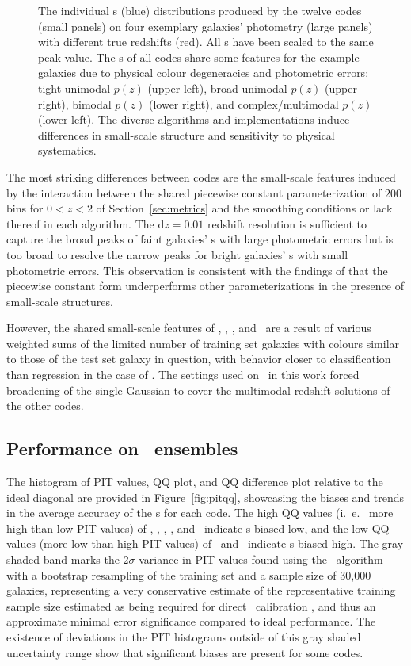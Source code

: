 \begin{figure}
\caption{The individual \pzpdf s (blue) distributions produced by the twelve codes (small panels) on four exemplary galaxies' photometry (large panels) with different true redshifts (red).
All \pzpdf s have been scaled to the same peak value.
The \pzpdf s of all codes share some features for the example galaxies due to physical colour degeneracies and photometric errors: tight unimodal $p(z)$ (upper left), broad unimodal $p(z)$ (upper right), bimodal $p(z)$ (lower right), and complex/multimodal $p(z)$ (lower left).
The diverse algorithms and implementations induce differences in small-scale structure and sensitivity to physical systematics.}
\label{fig:pz_examples}
\end{figure}

The most striking differences between codes are the small-scale features induced by the interaction between the shared piecewise constant parameterization of $200$ bins for $0 < z < 2$ of Section~\ref{sec:metrics} and the smoothing conditions or lack thereof in each algorithm.
The $\mathrm{d}z = 0.01$ redshift resolution is sufficient to capture the broad peaks of faint galaxies' \pzpdf s with large photometric errors but is too broad to resolve the narrow peaks for bright galaxies' \pzpdf s with small photometric errors.
This observation is consistent with the findings of \citet[]{Malz:2018} that the piecewise constant form underperforms other parameterizations in the presence of small-scale structures.

However, the shared small-scale features of \annz, \metaphor, \cmnn, and \skynet\ are a result of various weighted sums of the limited number of training set galaxies with colours similar to those of the test set galaxy in question, with behavior closer to classification than regression in the case of \annz.
The settings used on \gpz\ in this work forced broadening of the single Gaussian to cover the multimodal redshift solutions of the other codes.

\subsection{Performance on \pzpdf\ ensembles}
\label{sec:pitqq}

The histogram of PIT values, QQ plot, and QQ difference plot relative to the ideal diagonal are provided in Figure~\ref{fig:pitqq}, showcasing the biases and trends in the average accuracy of the \pzpdf s for each code.
The high QQ values (i.~e.~ more high than low PIT values) of \bpz, \cmnn, \delight, \eazy, and \gpz\ indicate \pzpdf s biased low, and the low QQ values (more low than high PIT values) of \skynet\ and \tpz\ indicate \pzpdf s biased high.
The gray shaded band marks the $2\sigma$ variance in PIT values found using the \trainz\ algorithm with a bootstrap resampling of the training set and a sample size of 30,000 galaxies, representing a very conservative estimate of the representative training sample size estimated as being required for direct \pz\ calibration \citep{Newman:2015}, and thus an approximate minimal error significance compared to ideal performance.
The existence of deviations in the PIT histograms outside of this gray shaded uncertainty range show that significant biases are present for some codes.

